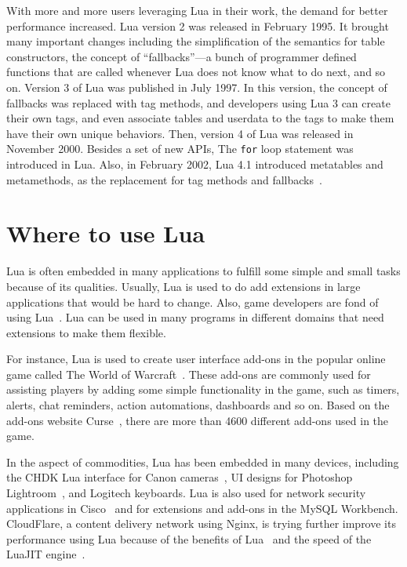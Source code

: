 


With more and more users leveraging Lua in their work, the demand for better performance increased. Lua version 2 was released in February 1995. It brought many important changes including the simplification of the semantics for table constructors,
the concept of ``fallbacks''---a bunch of programmer defined functions that are called whenever Lua does not know what to do next, and so on. Version 3 of Lua was published in July 1997. In this version, the concept of fallbacks was replaced with tag methods, and developers using Lua 3 can create their own tags, and even associate tables and userdata to the tags to make them have their own unique behaviors. Then, version 4 of Lua was released in November 2000. Besides a set of new APIs, The {\tt for} loop statement was introduced in Lua. 
Also, in February 2002, Lua 4.1 introduced metatables and metamethods, as the replacement for tag methods and fallbacks~\cite{TEL}.

\section{Where to use Lua}
Lua is often embedded in many applications to fulfill some simple and small tasks because of its qualities. Usually, Lua is used to do add extensions in large applications that would be hard to change. Also, game developers are fond of using Lua~\cite{AIL}. Lua can be used in many programs in different domains that need extensions to make them flexible. 

For instance, Lua is used to create user interface add-ons in the popular online game called The World of Warcraft~\cite{WLA}. These add-ons are commonly used for assisting players by adding some simple functionality in the game, such as timers, alerts, chat reminders, action automations, dashboards and so on. Based on the add-ons website Curse~\cite{WCU}, there are more than 4600 different add-ons used in the game.

In the aspect of commodities, Lua has been embedded in many devices, including the CHDK Lua interface for Canon cameras~\cite{CLFL}, UI designs for Photoshop Lightroom~\cite{APLL}, and Logitech keyboards. Lua is also used for network security applications in Cisco~\cite{CISCO} and for extensions and add-ons in the MySQL Workbench. CloudFlare, a content delivery network using Nginx, is trying further improve its performance using Lua because of the benefits of Lua~\cite{NPL} and the speed of the LuaJIT engine~\cite{LJT}.

